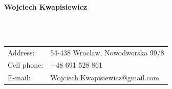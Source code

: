 \documentclass[a4paper,10pt]{article}
\begin{document}
\begin{LARGE} 
	\textbf{Wojciech Kwapisiewicz}
\end{LARGE}\\
\\
\begin{tabular}{p{}|p{}}
	Address:    & 54-438 Wroclaw, Nowodworska 99/8 \\
	Cell phone: & +48 691 528 861                  \\
	E-mail:     & Wojciech.Kwapisiewicz@gmail.com
\end{tabular}\\
\\
\\
\\
\\
\\

\\
\\

\\
\\

\\
\\

\\
\\

\\
\\

\end{document}
